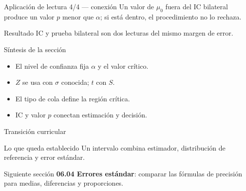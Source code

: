 \documentclass[10pt,aspectratio=169]{beamer}
\begin{document}
\begin{frame}{Aplicación de lectura 4/4 --- conexión}
  \footnotesize
  Un valor de $\mu_0$ fuera del IC bilateral produce un valor $p$ menor que
  $\alpha$; si está dentro, el procedimiento no lo rechaza.
  \begin{exampleblock}{Resultado}
    IC y prueba bilateral son dos lecturas del mismo margen de error.
  \end{exampleblock}
\end{frame}

\begin{frame}{Síntesis de la sección}
  \footnotesize
  \begin{itemize}\itemsep=0.12cm
    \item El nivel de confianza fija $\alpha$ y el valor crítico.
    \item $Z$ se usa con $\sigma$ conocida; $t$ con $S$.
    \item El tipo de cola define la región crítica.
    \item IC y valor $p$ conectan estimación y decisión.
  \end{itemize}
\end{frame}

\begin{frame}{Transición curricular}
  \footnotesize
  \begin{block}{Lo que queda establecido}
    Un intervalo combina estimador, distribución de referencia y error estándar.
  \end{block}
  \begin{alertblock}{Siguiente sección}
    \textbf{06.04 Errores estándar}: comparar las fórmulas de precisión para
    medias, diferencias y proporciones.
  \end{alertblock}
\end{frame}
\end{document}

